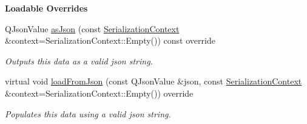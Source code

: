 \begin{Indent}\textbf{ Loadable Overrides}\par
\begin{DoxyCompactItemize}
\item 
\mbox{\label{classrev_1_1_scene_a99ffc0ebd57ff22d21ef9ba070245528}} 
Q\+Json\+Value \mbox{\hyperlink{classrev_1_1_scene_a99ffc0ebd57ff22d21ef9ba070245528}{as\+Json}} (const \mbox{\hyperlink{structrev_1_1_serialization_context}{Serialization\+Context}} \&context=Serialization\+Context\+::\+Empty()) const override
\begin{DoxyCompactList}\small\item\em Outputs this data as a valid json string. \end{DoxyCompactList}\item 
\mbox{\label{classrev_1_1_scene_aa218caf44e39da5302228db1110dc452}} 
virtual void \mbox{\hyperlink{classrev_1_1_scene_aa218caf44e39da5302228db1110dc452}{load\+From\+Json}} (const Q\+Json\+Value \&json, const \mbox{\hyperlink{structrev_1_1_serialization_context}{Serialization\+Context}} \&context=Serialization\+Context\+::\+Empty()) override
\begin{DoxyCompactList}\small\item\em Populates this data using a valid json string. \end{DoxyCompactList}\end{DoxyCompactItemize}
\end{Indent}
